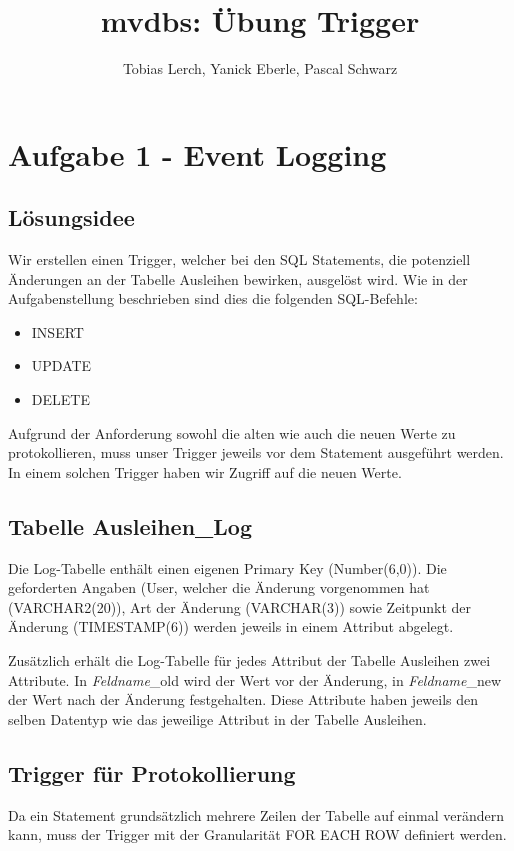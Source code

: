 \documentclass[11pt,a4paper,parskip=half]{scrartcl}
\title{mvdbs: Übung Trigger}
\author{Tobias Lerch, Yanick Eberle, Pascal Schwarz}
\begin{document}
\maketitle

\section{Aufgabe 1 - Event Logging}
\subsection{Lösungsidee}
Wir erstellen einen Trigger, welcher bei den SQL Statements, die potenziell Änderungen an der Tabelle \glqq{}Ausleihen\grqq{} bewirken, ausgelöst wird. Wie in der Aufgabenstellung beschrieben sind dies die folgenden SQL-Befehle:

\begin{itemize}
	\item{INSERT}
	\item{UPDATE}
	\item{DELETE}
\end{itemize}

Aufgrund der Anforderung sowohl die alten wie auch die neuen Werte zu protokollieren, muss unser Trigger jeweils vor dem Statement ausgeführt werden. In einem solchen Trigger haben wir Zugriff auf die neuen Werte.

\subsection{Tabelle Ausleihen\_Log}
Die Log-Tabelle enthält einen eigenen Primary Key (Number(6,0)). Die geforderten Angaben (User, welcher die Änderung vorgenommen hat (VARCHAR2(20)), Art der Änderung (VARCHAR(3)) sowie Zeitpunkt der Änderung (TIMESTAMP(6)) werden jeweils in einem Attribut abgelegt.

Zusätzlich erhält die Log-Tabelle für jedes Attribut der Tabelle Ausleihen zwei Attribute. In \emph{Feldname}\_old wird der Wert vor der Änderung, in \emph{Feldname}\_new der Wert nach der Änderung festgehalten. Diese Attribute haben jeweils den selben Datentyp wie das jeweilige Attribut in der Tabelle \glqq{}Ausleihen\grqq{}.

\subsection{Trigger für Protokollierung}
Da ein Statement grundsätzlich mehrere Zeilen der Tabelle \glqq{}auf einmal\grqq{} verändern kann, muss der Trigger mit der Granularität \glqq{}FOR EACH ROW\grqq{} definiert werden.
\end{document}
